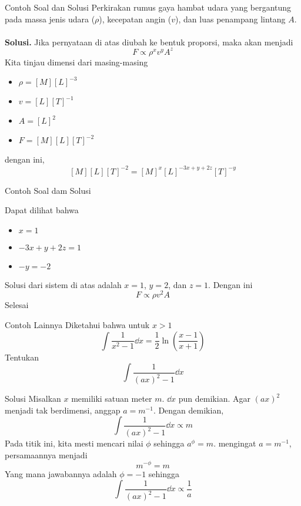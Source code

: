 \documentclass[handout,11pt]{beamer}
\begin{document}
\begin{frame}{Contoh Soal dan Solusi}
Perkirakan rumus gaya hambat udara yang bergantung pada massa jenis udara ($\rho$), kecepatan angin ($v$), dan luas penampang lintang $A$.\\~\\
    
    \textbf{Solusi. } Jika pernyataan di atas diubah ke bentuk proporsi, maka akan menjadi
    $$F \propto \rho^x v^y A^z$$
    Kita tinjau dimensi dari masing-masing 
    \begin{itemize}
      \item $\rho = \unit{[M][L]^{-3}}$
      \item $v = \unit{[L][T]^{-1}}$
      \item $A = \unit{[L]^2}$
      \item $F = \unit{[M][L][T]^{-2}}$
    \end{itemize}
    dengan ini,
    $$\unit{[M][L][T]^{-2}} =\unit{[M]^x [L]^{-3x+y+2z} [T]^{-y}}$$
  \end{frame}
  
  \begin{frame}{Contoh Soal dam Solusi}
    
    Dapat dilihat bahwa 
    \begin{itemize}
      \item $x=1$
      \item $-3x+y+2z=1$
      \item $-y=-2$
    \end{itemize}
    Solusi dari sistem di atas adalah $x=1$, $y=2$, dan $z=1$. Dengan ini
    $$\boxed{F\propto \rho v^2 A}$$
    Selesai
\end{frame}


\begin{frame}{Contoh Lainnya}
  Diketahui bahwa untuk $x>1$
  $$\int{\frac{1}{x^2-1}}\dd x = \frac{1}{2}\ln(\frac{x-1}{x+1})$$
  Tentukan
  $$\int{\frac{1}{(ax)^2-1}}\dd x$$
\end{frame}

\begin{frame}{Solusi}
  Misalkan $x$ memiliki satuan meter $m$. $\dd x$ pun demikian. Agar $(ax)^2$ menjadi tak berdimensi, anggap $a=m^{-1}$. 
  Dengan demikian,
  $$\int{\frac{1}{(ax)^2-1}}\dd x \propto m$$
  Pada titik ini, kita mesti mencari nilai $\phi$ sehingga $a^\phi = m$. mengingat $a=m^{-1}$, persamaannya menjadi
  $$m^{-\phi}=m$$
  Yang mana jawabannya adalah $\phi=-1$ sehingga 
  $$\int{\frac{1}{(ax)^2-1}}\dd x \propto \frac{1}{a}$$
\end{frame}
\end{document}
